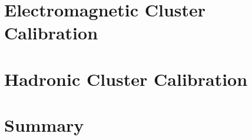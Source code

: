 \documentclass
[
]
{thesis}
\begin{document}
\chapter{Electromagnetic Cluster Calibration}

\chapter{Hadronic Cluster Calibration} 

\chapter{Summary}




%

%

%




\end{document}

